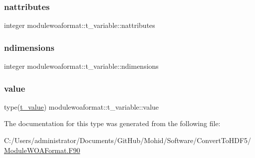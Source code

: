 \subsubsection{\texorpdfstring{nattributes}{nattributes}}
{\footnotesize\ttfamily integer modulewoaformat\+::t\+\_\+variable\+::nattributes\hspace{0.3cm}{\ttfamily [private]}}

\mbox{\label{structmodulewoaformat_1_1t__variable_a76723a99321cec729b57508c62a3fca1}} 
\subsubsection{\texorpdfstring{ndimensions}{ndimensions}}
{\footnotesize\ttfamily integer modulewoaformat\+::t\+\_\+variable\+::ndimensions\hspace{0.3cm}{\ttfamily [private]}}

\mbox{\label{structmodulewoaformat_1_1t__variable_af0561c343e65e87d785749c5348be26f}} 
\subsubsection{\texorpdfstring{value}{value}}
{\footnotesize\ttfamily type(\mbox{\hyperlink{structmodulewoaformat_1_1t__value}{t\+\_\+value}}) modulewoaformat\+::t\+\_\+variable\+::value\hspace{0.3cm}{\ttfamily [private]}}



The documentation for this type was generated from the following file\+:\begin{DoxyCompactItemize}
\item 
C\+:/\+Users/administrator/\+Documents/\+Git\+Hub/\+Mohid/\+Software/\+Convert\+To\+H\+D\+F5/\mbox{\hyperlink{_module_w_o_a_format_8_f90}{Module\+W\+O\+A\+Format.\+F90}}\end{DoxyCompactItemize}
